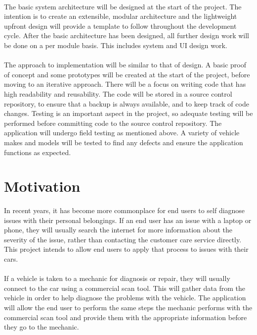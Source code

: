 	\paragraph{}{
	The basic system architecture will be designed at the start of the project. The intention is to create an extensible, modular architecture and the lightweight upfront design will provide a template to follow throughout the development cycle. After the basic architecture has been designed, all further design work will be done on a per module basis. This includes system and UI design work.
	}
	\paragraph{}{
 	The approach to implementation will be similar to that of design. A basic proof of concept and some prototypes will be created at the start of the project, before moving to an iterative approach. There will be a focus on writing code that has high readability and reusability. The code will be stored in a source control repository, to ensure that a backup is always available, and to keep track of code changes. Testing is an important aspect in the project, so adequate testing will be performed before committing code to the source control repository. The application will undergo field testing as mentioned above. A variety of vehicle makes and models will be tested to find any defects and ensure the application functions as expected. 
	}

\section{Motivation}
	\paragraph{}{
	In recent years, it has become more commonplace for end users to self diagnose issues with their personal belongings. If an end user has an issue with a laptop or phone, they will usually search the internet for more information about the severity of the issue, rather than contacting the customer care service directly. This project intends to allow end users to apply that process to issues with their cars.
	}
	\paragraph{}{
	If a vehicle is taken to a mechanic for diagnosis or repair, they will usually connect to the car using a commercial scan tool. This will gather data from the vehicle in order to help diagnose the problems with the vehicle. The application will allow the end user to perform the same steps the mechanic performs with the commercial scan tool and provide them with the appropriate information before they go to the mechanic.
	}
